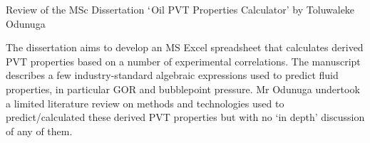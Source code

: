\documentclass[14pt,twoside]{report}
\begin{document}
\clearpage




\bigskip

\begin{center}
{\Large Review of the MSc Dissertation $\lq$Oil PVT Properties Calculator' by Toluwaleke Odunuga}
\end{center}

\medskip

The dissertation aims to develop an MS Excel spreadsheet that calculates derived PVT properties based on a number of experimental correlations. The manuscript describes a few industry-standard algebraic expressions used to predict fluid properties, in particular GOR and bubblepoint pressure. Mr Odunuga undertook a limited literature review on methods and technologies used to predict/calculated these derived PVT properties but with no `in depth' discussion of any of them.
\end{document}
